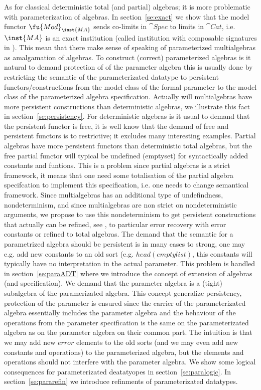 As for classical deterministic total (and partial) algebras; it is more
 problematic with parameterization of algebras.  In section~\ref{se:exact} we
 show that the model functor $\fu{Mod}_{\inst{MA}}$ sends co-limits in
 $\cat{Spec}$ to limits in $\cat{Cat}$, i.e. $\inst{MA}$ is an exact
 institution \cite{statestruct} (called institution with composable
 signatures in \cite{stateinst}). This mean that there make sense of speaking
 of parameterized multialgebras as amalgamation of algebras. To construct
 (correct) parameterized algebras is it natural to demand protection of of
 the parameter algebra this is usually done by restricting the semantic of
 the parameterizated datatype to persistent functors/constructions from the
 model class of the formal parameter to the model class of the parameterized
 algebra specification. Actually will multialgebras have more persistent
 constructions than deterministic algebras, we illustrate this fact in
 section~\ref{se:persistency}. For deterministic algebras is it usual to
 demand that the persistent functor is free, it is well know that the demand
 of free and persistent functors is to restrictive; it excludes many
 interesting examples. Partial algebras have more persistent functors than
 deterministic total algebras, but the free partial functor will typical be
 undefined (emptyset) for syntactically added constants and funtions. This is
 a problem since partial algebras is a strict framework, it means that one
 need some totalisation of the partial algebra specifcation to implement this
 specification, i.e. one needs to change semantical framework. Since
 multialgebras has an additional type of undefindness, nondeterminism, and
 since multialgebras are non strict on nondeterministic arguments, we propose
 to use this nondeterminism to get persistent constructions that actually can
 be refined, see \cite{partial}, to particular error recovery with error
 constants or refined to total algebras.  The demand that the semantic for a
 parametrized algebra should be persistent is in many cases to strong, one
 may e.g. add new constants to an old sort (e.g. $head(emptylist)$, this
 constants will typically have no interpretation in the actual
 parameter. This problem is handled in section~\ref{se:paraADT} where we
 introduce the concept of extension of algebras (and specification). We
 demand that the parameter algebra is a (tight) subalgebra of the
 paramerizated algebra. This concept generalize persistency, protection of
 the parameter is ensured since the carrier of the parameterizated algebra
 essentially includes the parameter algebra and the behaviour of the
 operations from the parameter specification is the same on the
 parameterizated algebra as on the parameter algebra on their common
 part. The intuition is that we may add new $error$ elements to the old sorts
 (and we may even add new constants and operations) to the parameterized
 algebra, but the elements and operations should not interfere with the
 parameter algebra.  We show some logical consequences for parameterizated
 deatatyopes in section~\ref{se:paralogic}. In section~\ref{se:pararefin} we
 introduce refinments of parameterizated datatypes.

